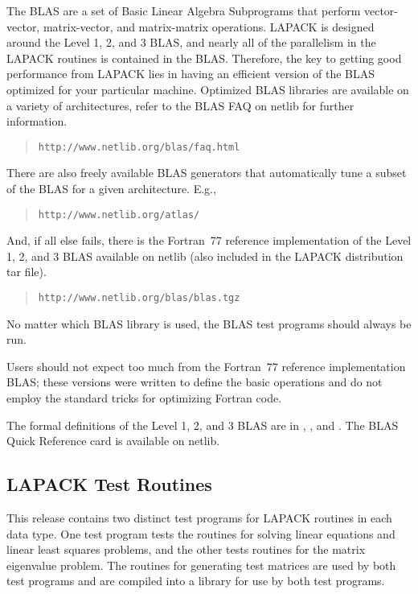 \hspace{\parindent}
The BLAS are a set of Basic Linear Algebra Subprograms that perform
vector-vector, matrix-vector, and matrix-matrix operations. 
LAPACK is designed around the Level 1, 2, and 3 BLAS, and nearly all
of the parallelism in the LAPACK routines is contained in the BLAS.
Therefore,
the key to getting good performance from LAPACK lies in having an
efficient version of the BLAS optimized for your particular machine. 
Optimized BLAS libraries are available on a variety of architectures,
refer to the BLAS FAQ on netlib for further information.
\begin{quote}
{\tt http://www.netlib.org/blas/faq.html}
\end{quote}
There are also freely available BLAS generators that automatically
tune a subset of the BLAS for a given architecture.  E.g.,
\begin{quote}
{\tt http://www.netlib.org/atlas/}
\end{quote}
And, if all else fails, there is the Fortran~77 reference implementation
of the Level 1, 2, and 3 BLAS available on netlib (also included in
the LAPACK distribution tar file).
\begin{quote}
{\tt http://www.netlib.org/blas/blas.tgz}
\end{quote}
No matter which BLAS library is used, the BLAS test programs should
always be run.

Users should not expect too much from the Fortran~77 reference implementation
BLAS; these versions were written to define the basic operations and do not
employ the standard tricks for optimizing Fortran code.

The formal definitions of the Level 1, 2, and 3 BLAS
are in \cite{BLAS1}, \cite{BLAS2}, and \cite{BLAS3}. 
The BLAS Quick Reference card is available on netlib.

\subsection{LAPACK Test Routines}

\hspace{\parindent}
This release contains two distinct test programs for LAPACK routines
in each data type.  One test program tests the routines for solving
linear equations and linear least squares problems,
and the other tests routines for the matrix eigenvalue problem.
The routines for generating test matrices are used by both test
programs and are compiled into a library for use by both test programs.

